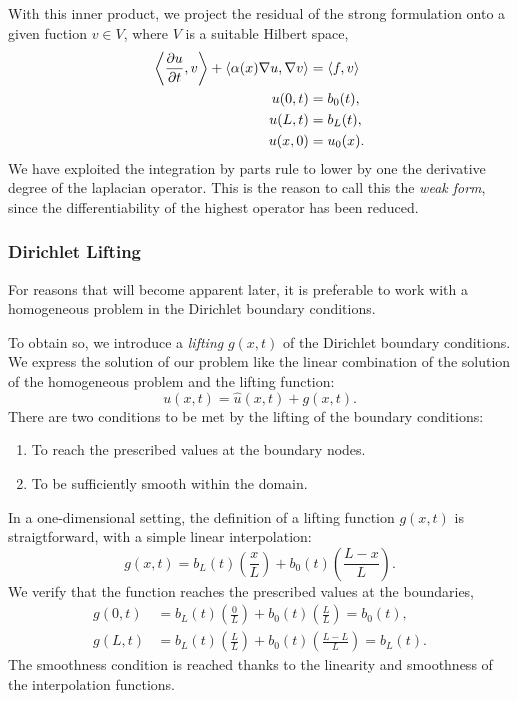 \documentclass[../main.tex]{subfiles}
\newcommand{\inner}[2]{\left<#1, #2\right>}
\begin{document}
With this inner product, we project the residual of the strong formulation onto a given fuction $v \in V$,
where $V$ is a suitable Hilbert space,
\begin{subequations}
    \begin{align}
        \label{eq:1d_fom_weak_formulation}
        \inner{\frac{\partial u}{\partial t}}{v} + \inner{\alpha(x) \grad u}{\grad v} &= \inner{f}{v} \\
        u(0, t) &= b_0(t), \\
        u(L, t) &= b_L(t), \\
        u(x, 0) &= u_0(x).
    \end{align}
\end{subequations}
We have exploited the integration by parts rule to lower by one the derivative degree of the laplacian operator.
This is the reason to call this the \emph{weak form}, since the differentiability of the highest operator has been reduced.

\subsubsection{Dirichlet Lifting}
\label{sec:1d_fom_heat_equation_dirichlet_lifting}
For reasons that will become apparent later, it is preferable to work with a homogeneous problem in the Dirichlet boundary conditions.

To obtain so, we introduce a \emph{lifting} $g(x,t)$ of the Dirichlet boundary conditions.
We express the solution of our problem like the linear combination of the solution of the homogeneous problem and the lifting function:
\begin{equation}
    \label{eq:1d_fom_homogeneous_plus_lifting}
    u(x,t) = \hat{u}(x,t) + g(x,t).
\end{equation}
There are two conditions to be met by the lifting of the boundary conditions:
\begin{enumerate}
    \item To reach the prescribed values at the boundary nodes.
    \item To be sufficiently smooth within the domain.
\end{enumerate}
In a one-dimensional setting, the definition of a lifting function $g(x,t)$ is straigtforward, with a simple linear interpolation:
\begin{equation}
    \label{eq:1d_fom_dirichlet_lifting}
    g(x,t) = b_L(t) \left(\frac{x}{L}\right) + b_0(t) \left(\frac{L - x}{L}\right).
\end{equation}
We verify that the function reaches the prescribed values at the boundaries,
\begin{subequations}
    \begin{align*}
        g(0,t) &= b_L(t) \left(\frac{0}{L}\right) + b_0(t) \left(\frac{L}{L}\right) = b_0(t), \\
        g(L,t) &= b_L(t) \left(\frac{L}{L}\right) + b_0(t) \left(\frac{L - L}{L}\right) = b_L(t).
    \end{align*}
\end{subequations}
The smoothness condition is reached thanks to the linearity and smoothness of the interpolation functions.
\end{document}
